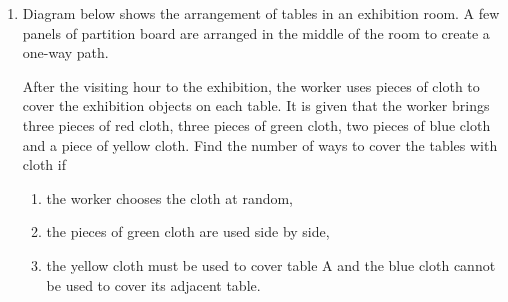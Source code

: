 \documentclass{report}
\begin{document}
\begin{multicols*}{2}
\begin{enumerate}
            \item Diagram below shows the arrangement of tables in an exhibition room. A few
                  panels of partition board are arranged in the middle of the room to create a
                  one-way path.

                  After the visiting hour to the exhibition, the worker uses pieces of cloth to
                  cover the exhibition objects on each table. It is given that the worker brings
                  three pieces of red cloth, three pieces of green cloth, two pieces of blue
                  cloth and a piece of yellow cloth. Find the number of ways to cover the tables
                  with cloth if
                  \begin{enumerate}
                        \item the worker chooses the cloth at random,
                        \item the pieces of green cloth are used side by side,
                        \item the yellow cloth must be used to cover table A and the blue cloth cannot be
                              used to cover its adjacent table.
                  \end{enumerate}
      \end{enumerate}
\end{multicols*}
\end{document}
